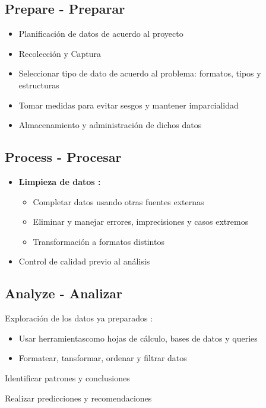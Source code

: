 \subsection{Prepare - Preparar}
\begin{itemize}
    \item {Planificación de datos de acuerdo al proyecto}
    \item {Recolección y Captura}
    \item {Seleccionar tipo de dato de acuerdo al problema: formatos, tipos y estructuras}
    \item {Tomar medidas para evitar sesgos y mantener imparcialidad}
    \item {Almacenamiento y administración de dichos datos}
\end{itemize}

\subsection{Process - Procesar}
\begin{itemize}
    \item {\textbf{Limpieza de datos : }
    \begin{itemize}
        \item {Completar datos usando otras fuentes externas}
        \item {Eliminar y manejar errores, imprecisiones y casos extremos}
        \item {Transformación a formatos distintos}
    \end{itemize}}
    \item {Control de calidad previo al análisis}
\end{itemize}

\subsection{Analyze - Analizar}
\begin{itemize}
    \item {Exploración de los datos ya preparados :
    \begin{itemize}
        \item {Usar herramientascomo hojas de cálculo, bases de datos y queries}
        \item {Formatear, tansformar, ordenar y filtrar datos}
    \end{itemize}
    \item {Identificar patrones y conclusiones}
    \item {Realizar predicciones y recomendaciones}}
\end{itemize}

